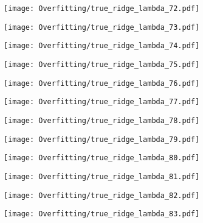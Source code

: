 \documentclass[xcolor=pdftex,dvipsnames,table]{beamer}
\begin{document}
\frame
{
	\begin{center}
		\texttt{[image: Overfitting/true\_ridge\_lambda\_72.pdf]}
	\end{center}
}

\frame
{
	\begin{center}
		\texttt{[image: Overfitting/true\_ridge\_lambda\_73.pdf]}
	\end{center}
}

\frame
{
	\begin{center}
		\texttt{[image: Overfitting/true\_ridge\_lambda\_74.pdf]}
	\end{center}
}

\frame
{
	\begin{center}
		\texttt{[image: Overfitting/true\_ridge\_lambda\_75.pdf]}
	\end{center}
}

\frame
{
	\begin{center}
		\texttt{[image: Overfitting/true\_ridge\_lambda\_76.pdf]}
	\end{center}
}

\frame
{
	\begin{center}
		\texttt{[image: Overfitting/true\_ridge\_lambda\_77.pdf]}
	\end{center}
}

\frame
{
	\begin{center}
		\texttt{[image: Overfitting/true\_ridge\_lambda\_78.pdf]}
	\end{center}
}

\frame
{
	\begin{center}
		\texttt{[image: Overfitting/true\_ridge\_lambda\_79.pdf]}
	\end{center}
}

\frame
{
	\begin{center}
		\texttt{[image: Overfitting/true\_ridge\_lambda\_80.pdf]}
	\end{center}
}

\frame
{
	\begin{center}
		\texttt{[image: Overfitting/true\_ridge\_lambda\_81.pdf]}
	\end{center}
}

\frame
{
	\begin{center}
		\texttt{[image: Overfitting/true\_ridge\_lambda\_82.pdf]}
	\end{center}
}

\frame
{
	\begin{center}
		\texttt{[image: Overfitting/true\_ridge\_lambda\_83.pdf]}
	\end{center}
}
\end{document}
